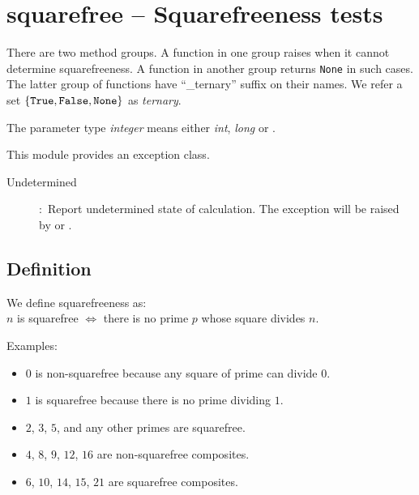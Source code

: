

 \section{squarefree -- Squarefreeness tests}

There are two method groups.
A function in one group raises  when it cannot determine squarefreeness.
A function in another group returns {\tt None} in such cases.
The latter group of functions have ``\_ternary'' suffix on their names.
We refer a set \(\{{\tt True}, {\tt False}, {\tt None}\}\) as {\it ternary}.

The parameter type {\it integer} means either {\it int}, {\it long} or .

This module provides an exception class.
\begin{description}
  \item[Undetermined]:\ Report undetermined state of calculation.
    The exception will be raised by
     or
    .
\end{description}

\subsection{Definition}

  We define squarefreeness as:\\
  \(n\) is squarefree \(\iff\) there is no prime \(p\) whose square divides \(n\).

\vspace{1em}
\noindent Examples:
  \begin{itemize}
  \item \(0\) is non-squarefree because any square of prime can divide \(0\).
  \item \(1\) is squarefree because there is no prime dividing \(1\).
  \item \(2\), \(3\), \(5\), and any other primes are squarefree.
  \item \(4\), \(8\), \(9\), \(12\), \(16\) are non-squarefree composites.
  \item \(6\), \(10\), \(14\), \(15\), \(21\) are squarefree composites.
\end{itemize}


